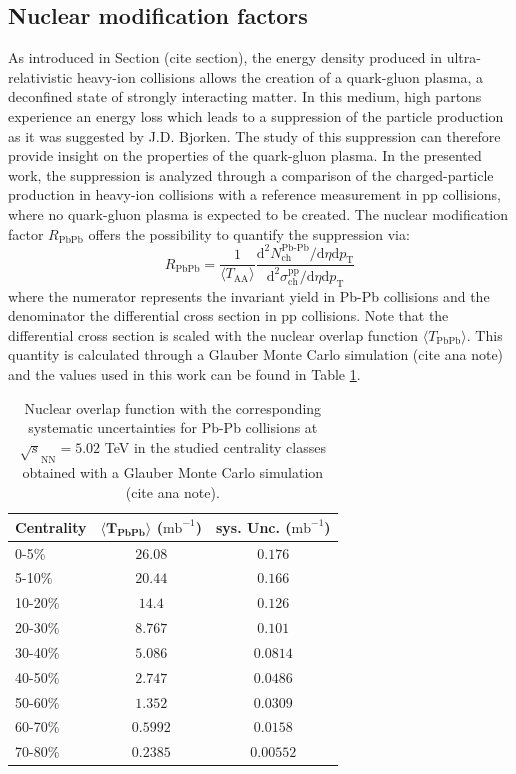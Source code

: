 \documentclass[12pt,a4paper]{report}
\begin{document}
\subsection{Nuclear modification factors}
As introduced in Section (cite section), the energy density produced in ultra-relativistic heavy-ion collisions  allows the creation of a quark-gluon plasma, a deconfined state of strongly interacting matter. In this medium, high \pt partons experience an energy loss which leads to a suppression of the particle production as it was suggested by J.D. Bjorken. The study of this suppression can therefore provide insight on the properties of the quark-gluon plasma. In the presented work, the suppression is analyzed through a comparison of the charged-particle production in heavy-ion collisions with a reference measurement in pp collisions, where no quark-gluon plasma is expected to be created. The nuclear modification factor $R_\text{PbPb} $ offers the possibility to quantify the suppression via:
\begin{equation}
R_\text{PbPb} = \dfrac{1}{\langle T_\text{AA}\rangle} \dfrac{\text{d}^2 N^\text{Pb-Pb}_\text{ch} / \text{d}\eta \text{d}p_\text{T}}{\text{d}^2 \sigma^\text{pp}_\text{ch} / \text{d}\eta \text{d}p_\text{T}}
\end{equation}
where the numerator represents the invariant yield in Pb-Pb collisions and the denominator the differential cross section in pp collisions. Note that the differential cross section is scaled with the nuclear overlap function $\langle T_\text{PbPb} \rangle$. This quantity is calculated through a Glauber Monte Carlo simulation (cite ana note) and the values used in this work can be found in Table \ref{tab:taa}.\\
\begin{table}[tb!]
\renewcommand{\arraystretch}{1.5}
\centering
\begin{tabular}{l c c}
\toprule
\rowcolor{headerBlue}  \textbf{Centrality} &  \textbf{$\mathbf{\langle T_\text{PbPb} \rangle}$ ($\text{mb}^{-1}$)}  &   \textbf{sys. Unc. } ($\text{mb}^{-1}$) \\
\midrule
\midrule
0-5\% & $26.08$  & $0.176$\\
5-10\% & $20.44$ & $0.166$\\
10-20\% & $14.4$ & $0.126$ \\
20-30\% & $8.767$ & $0.101$ \\
30-40\% & $5.086$ & $0.0814$ \\
40-50\% & $2.747$ & $0.0486$\\
50-60\% & $1.352$ & $0.0309$\\
60-70\% & $0.5992$ & $0.0158$\\
70-80\% & $0.2385$ & $0.00552$ \\
\bottomrule
\end{tabular}
\caption{Nuclear overlap function with the corresponding systematic uncertainties for Pb-Pb collisions at $\sqrt{s}_\text{NN}=5.02$ TeV in the studied centrality classes obtained with a Glauber Monte Carlo simulation (cite ana note).}
\label{tab:taa}
\end{table}
\end{document}
